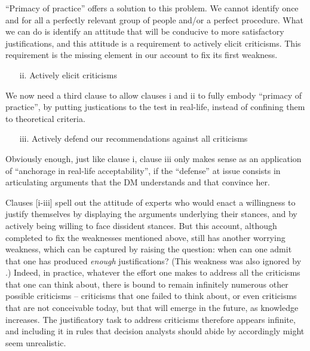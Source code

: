 \documentclass[preprint, french, english, 11pt, authoryear]{elsarticle}%
\begin{document}
``Primacy of practice” offers a solution to this problem. We cannot identify once and for all a perfectly relevant group of people and/or a perfect procedure. What we can do is identify an attitude that will be conducive to more satisfactory justifications, and this attitude is a requirement to actively elicit criticisms. This requirement is the missing element in our account to fix its first weakness.

\begin{itemize}
\item[ii.]	Actively elicit criticisms
\end{itemize}

We now need a third clause to allow clauses i and ii to fully embody “primacy of practice”, by putting justications to the test in real-life, instead of confining them to theoretical criteria.

\begin{itemize}
\item[iii.]	 Actively defend our recommendations against all criticisms
\end{itemize}

 Obviously enough, just like clause i, clause iii only makes sense as an application of ``anchorage in real-life acceptability'', if the ``defense'' at issue consists in articulating arguments that the \ac{DM} understands and that convince her.

Clauses [i-iii] spell out the attitude of experts who would enact a willingness to justify themselves by displaying the arguments underlying their stances, and by actively being willing to face dissident stances. But this account, although completed to fix the weaknesses mentioned above, still has another worrying weakness, which can be captured by raising the question: when can one admit that one has produced \emph{enough} justifications? (This weakness was also ignored by  \citet{meinard_what_2017}.) Indeed, in practice, whatever the effort one makes to address all the criticisms that one can think about, there is bound to remain infinitely numerous other possible criticisms -- criticisms that one failed to think about, or even criticisms that are not conceivable today, but that will emerge in the future, as knowledge increases. The justificatory task to address criticisms therefore appears infinite, and including it in rules that decision analysts should abide by accordingly might seem unrealistic.
\end{document}
